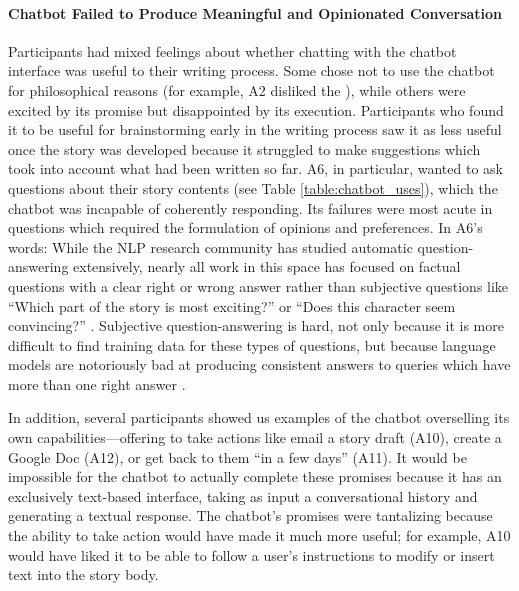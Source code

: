
\paragraph{Chatbot Failed to Produce Meaningful and Opinionated Conversation}

Participants had mixed feelings about whether chatting with the chatbot interface was useful to their writing process.
Some chose not to use the chatbot for philosophical reasons (for example, A2 disliked the ), while others were excited by its promise but disappointed by its execution. 
Participants who found it to be useful for brainstorming early in the writing process saw it as less useful once the story was developed because it struggled to make suggestions which took into account what had been written so far. 
A6, in particular, wanted to ask questions about their story contents (see Table \ref{table:chatbot_uses}), which the chatbot was incapable of coherently responding.
Its failures were most acute in questions which required the formulation of opinions and preferences.
In A6's words: 
While the NLP research community has studied automatic question-answering extensively, nearly all work in this space has focused on factual questions with a clear right or wrong answer rather than subjective questions like ``Which part of the story is most exciting?'' or ``Does this character seem convincing?'' \citep{huang2020recent}. Subjective question-answering is hard, not only because it is more difficult to find training data for these types of questions, but because language models are notoriously bad at producing consistent answers to queries which have more than one right answer \citep{li2021addressing}.

In addition, several participants showed us examples of the chatbot overselling its own capabilities---offering to take actions like email a story draft (A10), create a Google Doc (A12), or get back to them ``in a few days'' (A11).
It would be impossible for the chatbot to actually complete these promises because it has an exclusively text-based interface, taking as input a conversational history and generating a textual response.
The chatbot's promises were tantalizing because the ability to take action would have made it much more useful; for example, A10 would have liked it to be able to follow a user's instructions to modify or insert text into the story body.

